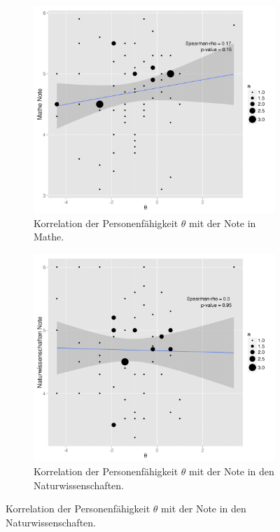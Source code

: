  \begin{figure}[htp]
 \centering
 \begin{subfigure}{0.49\textwidth}
   \includegraphics[width=1.0\linewidth]{graphics/corPersonenMathe.png}
   \caption{Korrelation der Personenfähigkeit $\theta$ mit der Note in Mathe.}
   \label{fig:corPersonenMathe}
 \end{subfigure}
 \begin{subfigure}{0.49\textwidth}
   \includegraphics[width=1.0\linewidth]{graphics/corPersonenNatw.png}
   \caption{Korrelation der Personenfähigkeit $\theta$ mit der Note in den Naturwissenschaften.}
   \label{fig:corPersonenNatW}
 \end{subfigure}
  \end{figure}
